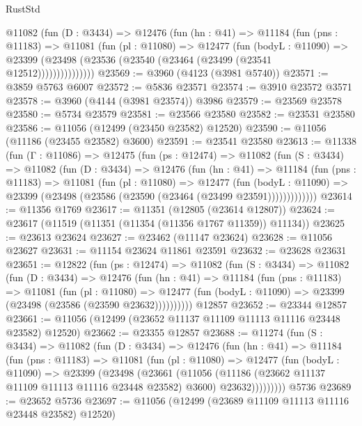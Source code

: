 \begin{lexlean}{RustStd}
\begin{coremodule}
          @11082
            (fun (D : @3434) =>
            @12476
              (fun (hn : @41) =>
              @11184
                (fun (pns : @11183) =>
                @11081
                  (fun (pl : @11080) =>
                  @12477
                    (fun (bodyL : @11090) =>
                    @23399 (@23498 (@23536 (@23540 (@23464 (@23499 (@23541 @12512)))))))))))))))
@23569 := @3960 (@4123 (@3981 @5740))
@23571 := @3859 @5763 @6007
@23572 := @5836 @23571
@23574 := @3910 @23572 @3571
@23578 := @3960 (@4144 (@3981 @23574)) @3986
@23579 := @23569 @23578
@23580 := @5734 @23579
@23581 := @23566 @23580
@23582 := @23531 @23580
@23586 := @11056 (@12499 (@23450 @23582) @12520)
@23590 := @11056 (@11186 (@23455 @23582) @3600)
@23591 := @23541 @23580
@23613 := @11338
    (fun (Γ : @11086) =>
    @12475
      (fun (ps : @12474) =>
      @11082
        (fun (S : @3434) =>
        @11082
          (fun (D : @3434) =>
          @12476
            (fun (hn : @41) =>
            @11184
              (fun (pns : @11183) =>
              @11081
                (fun (pl : @11080) =>
                @12477
                  (fun (bodyL : @11090) =>
                  @23399 (@23498 (@23586 (@23590 (@23464 (@23499 @23591)))))))))))))
@23614 := @11356 @1769
@23617 := @11351 (@12805 (@23614 @12807))
@23624 := @23617 (@11519 (@11351 (@11354 (@11356 @1767 @11359)) @11134))
@23625 := @23613 @23624
@23627 := @23462 (@11147 @23624)
@23628 := @11056 @23627
@23631 := @11154 @23624 @11861 @23591
@23632 := @23628 @23631
@23651 := @12822
    (fun (ps : @12474) =>
    @11082
      (fun (S : @3434) =>
      @11082
        (fun (D : @3434) =>
        @12476
          (fun (hn : @41) =>
          @11184
            (fun (pns : @11183) =>
            @11081
              (fun (pl : @11080) =>
              @12477 (fun (bodyL : @11090) => @23399 (@23498 (@23586 (@23590 @23632))))))))))
    @12857
@23652 := @23344 @12857
@23661 := @11056 (@12499 (@23652 @11137 @11109 @11113 @11116 @23448 @23582) @12520)
@23662 := @23355 @12857
@23688 := @11274
    (fun (S : @3434) =>
    @11082
      (fun (D : @3434) =>
      @12476
        (fun (hn : @41) =>
        @11184
          (fun (pns : @11183) =>
          @11081
            (fun (pl : @11080) =>
            @12477
              (fun (bodyL : @11090) =>
              @23399
                (@23498
                  (@23661
                    (@11056
                      (@11186 (@23662 @11137 @11109 @11113 @11116 @23448 @23582) @3600)
                      @23632)))))))))
    @5736
@23689 := @23652 @5736
@23697 := @11056 (@12499 (@23689 @11109 @11113 @11116 @23448 @23582) @12520)

\end{coremodule}
\end{lexlean}
